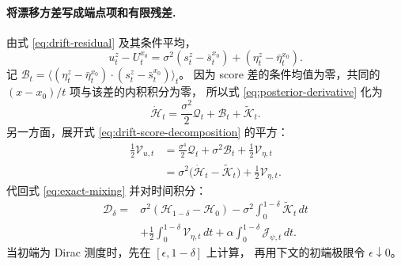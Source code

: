 \documentclass[UTF8,a4paper,11pt,fontset=fandol]{ctexart}
\begin{document}
\paragraph{将漂移方差写成端点项和有限残差.}
由式 \eqref{eq:drift-residual} 及其条件平均，
\begin{equation}
u_t^z-U_t^{x_0}
=\sigma^2(s_t^z-\bar s_t^{x_0})
+(\eta_t^z-\bar\eta_t^{x_0}).
\label{eq:drift-score-decomposition}
\end{equation}
记
$\mathcal B_t
=\langle(\eta_t^z-\bar\eta_t^{x_0})\cdot
(s_t^z-\bar s_t^{x_0})\rangle_t$。
因为 score 差的条件均值为零，共同的 $(x-x_0)/t$ 项与该差的内积积分为零，
所以式 \eqref{eq:posterior-derivative} 化为
\begin{equation}
\dot{\mathcal H}_t
=\frac{\sigma^2}{2}\mathcal Q_t+\mathcal B_t+\widetilde{\mathcal K}_t.
\end{equation}
另一方面，展开式 \eqref{eq:drift-score-decomposition} 的平方：
\begin{equation}
\begin{aligned}
\frac12\mathcal V_{u,t}
&=\frac{\sigma^4}{2}\mathcal Q_t+\sigma^2\mathcal B_t
+\frac12\mathcal V_{\eta,t}\\
&=\sigma^2\bigl(\dot{\mathcal H}_t-\widetilde{\mathcal K}_t\bigr)
+\frac12\mathcal V_{\eta,t}.
\end{aligned}
\end{equation}
代回式 \eqref{eq:exact-mixing} 并对时间积分：
\begin{equation}
\boxed{
\begin{aligned}
\mathcal D_\delta
={}&\sigma^2(\mathcal H_{1-\delta}-\mathcal H_0)
-\sigma^2\int_0^{1-\delta}\widetilde{\mathcal K}_t\,dt\\
&+\frac12\int_0^{1-\delta}\mathcal V_{\eta,t}\,dt
+\alpha\int_0^{1-\delta}\mathcal J_{\psi,t}\,dt.
\end{aligned}
}
\label{eq:mixing-correction-integrated}
\end{equation}
当初端为 Dirac 测度时，先在 $[\epsilon,1-\delta]$ 上计算，
再用下文的初端极限令 $\epsilon\downarrow0$。
\end{document}
